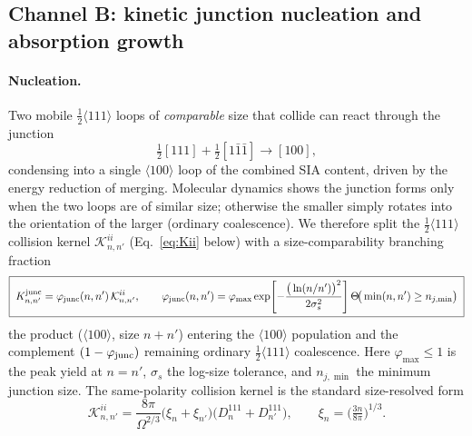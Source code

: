 \subsection{Channel B: kinetic junction nucleation and absorption growth}
\label{sec:channel-B}

\paragraph{Nucleation.}  Two mobile $\tfrac12\langle111\rangle$ loops of
\emph{comparable} size that collide can react through the junction
\citep{EyreBullough1965,Marian2002}
\begin{equation}
  \tfrac12[111] + \tfrac12[1\bar1\bar1] \rightarrow [100],
  \label{eq:junction}
\end{equation}
condensing into a single $\langle100\rangle$ loop of the combined SIA content,
driven by the energy reduction of merging.  Molecular dynamics shows the
junction forms only when the two loops are of similar size; otherwise the
smaller simply rotates into the orientation of the larger (ordinary
coalescence).  We therefore split the $\tfrac12\langle111\rangle$ collision
kernel $\mathcal K^{ii}_{n,n'}$ (Eq.~\ref{eq:Kii} below) with a
size-comparability branching fraction
\begin{equation}
  \boxed{\;K^{\rm junc}_{n,n'} = \varphi_{\rm junc}(n,n')\,\mathcal K^{ii}_{n,n'},
  \qquad
  \varphi_{\rm junc}(n,n') = \varphi_{\max}
  \exp\!\left[-\frac{\big(\ln(n/n')\big)^2}{2\sigma_s^2}\right]
  \Theta\!\big(\min(n,n')\ge n_{j,\min}\big)\;}
  \label{eq:phi-junc}
\end{equation}
the product ($\langle100\rangle$, size $n{+}n'$) entering the
$\langle100\rangle$ population and the complement $(1-\varphi_{\rm junc})$
remaining ordinary $\tfrac12\langle111\rangle$ coalescence.  Here
$\varphi_{\max}\!\le\!1$ is the peak yield at $n=n'$, $\sigma_s$ the log-size
tolerance, and $n_{j,\min}$ the minimum junction size.  The same-polarity
collision kernel is the standard size-resolved form
\begin{equation}
  \mathcal K^{ii}_{n,n'} = \frac{8\pi}{\Omega^{2/3}}
  \big(\xi_n+\xi_{n'}\big)\big(D^{111}_n+D^{111}_{n'}\big),\qquad
  \xi_n=\Big(\tfrac{3n}{8\pi}\Big)^{1/3}.
  \label{eq:Kii}
\end{equation}

